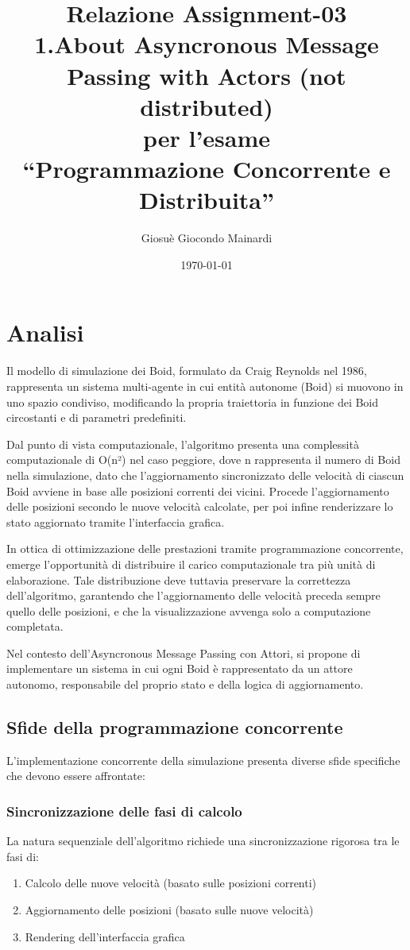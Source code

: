 \documentclass[a4paper,12pt]{report}
\title{Relazione Assignment-03 \\
1.About Asyncronous Message Passing with Actors (not distributed)\\ per l'esame \\ ``Programmazione Concorrente e Distribuita''}
\author{Giosuè Giocondo Mainardi}
\date{\today}
\begin{document}
\maketitle

\tableofcontents

\chapter{Analisi}
    Il modello di simulazione dei Boid, formulato da Craig Reynolds nel 1986, rappresenta un sistema multi-agente in cui 
    entità autonome (Boid) si muovono in uno spazio condiviso, modificando la propria traiettoria in funzione dei Boid 
    circostanti e di parametri predefiniti.
    
    Dal punto di vista computazionale, l'algoritmo presenta una complessità computazionale di O(n²) nel caso peggiore, dove n rappresenta 
    il numero di Boid nella simulazione, dato che l'aggiornamento sincronizzato delle velocità di ciascun Boid avviene
    in base alle posizioni correnti dei vicini. Procede l'aggiornamento delle posizioni secondo le nuove velocità 
    calcolate, per poi infine renderizzare lo stato aggiornato tramite l'interfaccia grafica.
    
    In ottica di ottimizzazione delle prestazioni tramite programmazione concorrente, emerge l'opportunità di distribuire 
    il carico computazionale tra più unità di elaborazione. Tale distribuzione deve tuttavia preservare la correttezza 
    dell'algoritmo, garantendo che l'aggiornamento delle velocità preceda sempre quello delle posizioni, e che la 
    visualizzazione avvenga solo a computazione completata.

    Nel contesto dell'Asyncronous Message Passing con Attori, si propone di implementare un sistema in cui ogni Boid 
    è rappresentato da un attore autonomo, responsabile del proprio stato e della logica di aggiornamento.

    \section{Sfide della programmazione concorrente}
        L'implementazione concorrente della simulazione presenta diverse sfide specifiche che devono essere affrontate:

        \subsection*{Sincronizzazione delle fasi di calcolo}
            La natura sequenziale dell'algoritmo richiede una sincronizzazione rigorosa tra le fasi di:
            \begin{enumerate}
                \item Calcolo delle nuove velocità (basato sulle posizioni correnti)
                \item Aggiornamento delle posizioni (basato sulle nuove velocità)
                \item Rendering dell'interfaccia grafica
            \end{enumerate}
            
\end{document}
